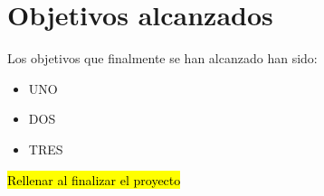 \section{Objetivos alcanzados}\label{objetivos-alcanzados}
Los objetivos que finalmente se han alcanzado han sido: 
\begin{itemize}
\tightlist
\item
 UNO
\item
  DOS
\item
  TRES
\end{itemize}
 \hl{Rellenar al finalizar el proyecto}